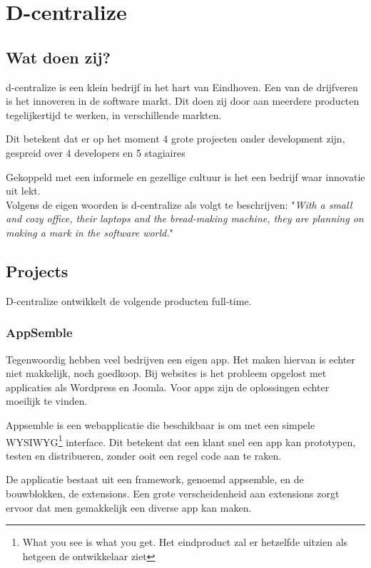 \chapter{D-centralize}
\section{Wat doen zij?}
d-centralize is een klein bedrijf in het hart van Eindhoven. Een van de drijfveren is het innoveren in de software markt. Dit doen zij door aan meerdere producten tegelijkertijd te werken, in verschillende markten.

Dit betekent dat er op het moment 4 grote projecten onder development zijn, gespreid over 4 developers en 5 stagiaires

Gekoppeld met een informele en gezellige cultuur is het een bedrijf waar innovatie uit lekt. \\

Volgens de eigen woorden is d-centralize als volgt te beschrijven: "\textit{With a small and cozy office, their laptops and the bread-making machine, they are planning on making a mark in the software world.}" \cite{dcent1}

\section{Projects}

D-centralize ontwikkelt de volgende producten full-time.

\subsection{AppSemble}

Tegenwoordig hebben veel bedrijven een eigen app. Het maken hiervan is echter niet makkelijk, noch goedkoop. Bij websites is het probleem opgelost met applicaties als Wordpress en Joomla. Voor apps zijn de oplossingen echter moeilijk te vinden. 

Appsemble is een webapplicatie die beschikbaar is om met een simpele WYSIWYG\footnote{What you see is what you get. Het eindproduct zal er hetzelfde uitzien als hetgeen de ontwikkelaar ziet} interface. Dit betekent dat een klant snel een app kan prototypen, testen en distribueren, zonder ooit een regel code aan te raken.

De applicatie bestaat uit een framework, genoemd appsemble, en de bouwblokken, de extensions. Een grote verscheidenheid aan extensions zorgt ervoor dat men gemakkelijk een diverse app kan maken.

